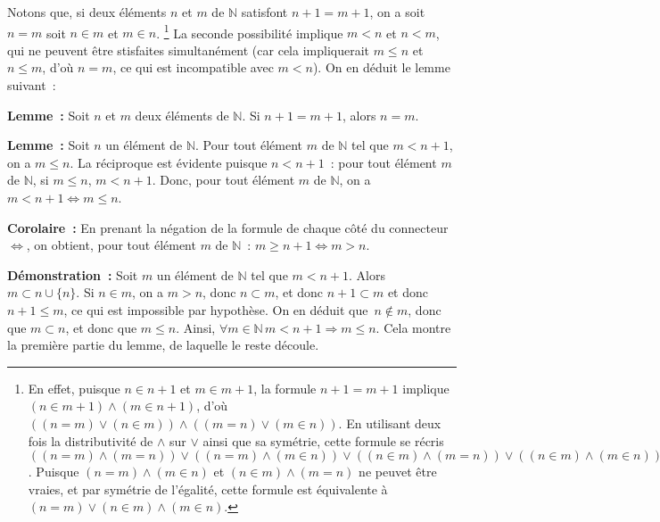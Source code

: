 Notons que, si deux éléments $n$ et $m$ de $\mathbb{N}$ satisfont $n+1 = m+1$, on a soit $n = m$ soit $n \in m$ et $m \in n$.%
\footnote{
    En effet, puisque $n \in n+1$ et $m \in m+1$, la formule $n+1 = m+1$ implique $(n \in m+1) \wedge (m \in n+1)$, d'où $((n = m) \vee (n \in m)) \wedge ((m = n) \vee (m \in n))$. 
    En utilisant deux fois la distributivité de $\wedge$ sur $\vee$ ainsi que sa symétrie, cette formule se récris $((n = m) \wedge (m = n)) \vee ((n = m) \wedge (m \in n)) \vee ((n \in m) \wedge (m = n)) \vee ((n \in m) \wedge (m \in n))$. 
    Puisque $(n = m) \wedge (m \in n)$ et $(n \in m) \wedge (m = n)$ ne peuvet être vraies, et par symétrie de l'égalité, cette formule est équivalente à $(n = m) \vee (n \in m) \wedge (m \in n)$.
}
La seconde possibilité implique $m < n$ et $n < m$, qui ne peuvent être stisfaites simultanément (car cela impliquerait $m \leq n$ et $n \leq m$, d'où $n = m$, ce qui est incompatible avec $m < n$). 
On en déduit le lemme suivant :

\medskip

\noindent\textbf{Lemme :} 
    Soit $n$ et $m$ deux éléments de $\mathbb{N}$. 
    Si $n+1 = m+1$, alors $n=m$.

\medskip

\noindent\textbf{Lemme :} 
    Soit $n$ un élément de $\mathbb{N}$. 
    Pour tout élément $m$ de $\mathbb{N}$ tel que $m < n+1$, on a $m \leq n$. 
    La réciproque est évidente puisque $n < n+1$ : pour tout élément $m$ de $\mathbb{N}$, si $m \leq n$, $m < n+1$. 
    Donc, pour tout élément $m$ de $\mathbb{N}$, on a $m < n+1 \Leftrightarrow m \leq n$. 

\medskip

\noindent\textbf{Corolaire :} 
    En prenant la négation de la formule de chaque côté du connecteur $\Leftrightarrow$, on obtient, pour tout élément $m$ de $\mathbb{N}$ : $m \geq n+1 \Leftrightarrow m > n$.

\medskip

\noindent\textbf{Démonstration :} 
    Soit $m$ un élément de $\mathbb{N}$ tel que $m < n+1$. 
    Alors $m \subset n \cup \lbrace n \rbrace$. 
    Si $n \in m$, on a $m > n$, donc $n \subset m$, et donc $n+1 \subset m$ et donc $n+1 \leq m$, ce qui est impossible par hypothèse. 
    On en déduit que $n \notin m$, donc que $m \subset n$, et donc que $m \leq n$. 
    Ainsi, $\forall m \in \mathbb{N}\, m < n+1 \Rightarrow m \leq n$. 
    Cela montre la première partie du lemme, de laquelle le reste découle. 
    
   \done 

